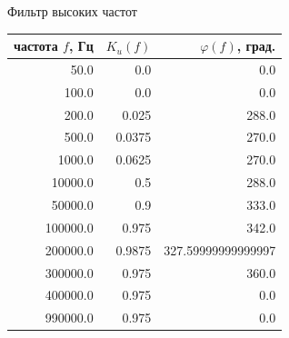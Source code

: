 \documentclass[10pt,a5paper]{article}
\begin{document}
\newpage

\begin{center}
\Large Фильтр высоких частот
\end{center}

\small
\begin{center}
\begin{tabular}{rrr}
\toprule
частота $f$, Гц & \hspace{1mm} $K_u(f)$ & \hspace{1mm} $\varphi(f)$, град. \\
\midrule
\num[round-mode=places,round-precision=0]{50.0} & \num[round-mode=places,round-precision=3]{0.0} & \num[round-mode=places,round-precision=3]{0.0} \\
\num[round-mode=places,round-precision=0]{100.0} & \num[round-mode=places,round-precision=3]{0.0} & \num[round-mode=places,round-precision=3]{0.0} \\
\num[round-mode=places,round-precision=0]{200.0} & \num[round-mode=places,round-precision=3]{0.025} & \num[round-mode=places,round-precision=3]{288.0} \\
\num[round-mode=places,round-precision=0]{500.0} & \num[round-mode=places,round-precision=3]{0.0375} & \num[round-mode=places,round-precision=3]{270.0} \\
\num[round-mode=places,round-precision=0]{1000.0} & \num[round-mode=places,round-precision=3]{0.0625} & \num[round-mode=places,round-precision=3]{270.0} \\
\num[round-mode=places,round-precision=0]{10000.0} & \num[round-mode=places,round-precision=3]{0.5} & \num[round-mode=places,round-precision=3]{288.0} \\
\num[round-mode=places,round-precision=0]{50000.0} & \num[round-mode=places,round-precision=3]{0.9} & \num[round-mode=places,round-precision=3]{333.0} \\
\num[round-mode=places,round-precision=0]{100000.0} & \num[round-mode=places,round-precision=3]{0.975} & \num[round-mode=places,round-precision=3]{342.0} \\
\num[round-mode=places,round-precision=0]{200000.0} & \num[round-mode=places,round-precision=3]{0.9875} & \num[round-mode=places,round-precision=3]{327.59999999999997} \\
\num[round-mode=places,round-precision=0]{300000.0} & \num[round-mode=places,round-precision=3]{0.975} & \num[round-mode=places,round-precision=3]{360.0} \\
\num[round-mode=places,round-precision=0]{400000.0} & \num[round-mode=places,round-precision=3]{0.975} & \num[round-mode=places,round-precision=3]{0.0} \\
\num[round-mode=places,round-precision=0]{990000.0} & \num[round-mode=places,round-precision=3]{0.975} & \num[round-mode=places,round-precision=3]{0.0} \\
\bottomrule
\end{tabular}
\end{center}
\end{document}
